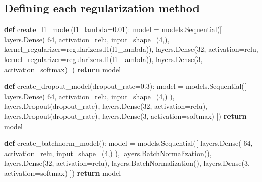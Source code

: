 \documentclass[
]{IEEEtran}
\newenvironment{Shaded}{\begin{snugshade}}{\end{snugshade}}
\newcommand{\ControlFlowTok}[1]{\textcolor[rgb]{0.00,0.23,0.31}{\textbf{#1}}}
\newcommand{\DecValTok}[1]{\textcolor[rgb]{0.68,0.00,0.00}{#1}}
\newcommand{\FloatTok}[1]{\textcolor[rgb]{0.68,0.00,0.00}{#1}}
\newcommand{\KeywordTok}[1]{\textcolor[rgb]{0.00,0.23,0.31}{\textbf{#1}}}
\newcommand{\NormalTok}[1]{\textcolor[rgb]{0.00,0.23,0.31}{#1}}
\newcommand{\OperatorTok}[1]{\textcolor[rgb]{0.37,0.37,0.37}{#1}}
\newcommand{\StringTok}[1]{\textcolor[rgb]{0.13,0.47,0.30}{#1}}
\begin{document}
\subsection{Defining each regularization
method}\label{defining-each-regularization-method}

\begin{Shaded}
\begin{Highlighting}[]
\KeywordTok{def}\NormalTok{ create\_l1\_model(l1\_lambda}\OperatorTok{=}\FloatTok{0.01}\NormalTok{):}
\NormalTok{    model }\OperatorTok{=}\NormalTok{ models.Sequential([}
\NormalTok{        layers.Dense(}
          \DecValTok{64}\NormalTok{, activation}\OperatorTok{=}\StringTok{\textquotesingle{}relu\textquotesingle{}}\NormalTok{,}
\NormalTok{          input\_shape}\OperatorTok{=}\NormalTok{(}\DecValTok{4}\NormalTok{,),}
\NormalTok{          kernel\_regularizer}\OperatorTok{=}\NormalTok{regularizers.l1(l1\_lambda)),}
\NormalTok{        layers.Dense(}\DecValTok{32}\NormalTok{, activation}\OperatorTok{=}\StringTok{\textquotesingle{}relu\textquotesingle{}}\NormalTok{,}
\NormalTok{          kernel\_regularizer}\OperatorTok{=}\NormalTok{regularizers.l1(l1\_lambda)),}
\NormalTok{        layers.Dense(}\DecValTok{3}\NormalTok{, activation}\OperatorTok{=}\StringTok{\textquotesingle{}softmax\textquotesingle{}}\NormalTok{)}
\NormalTok{    ])}
    \ControlFlowTok{return}\NormalTok{ model}

\KeywordTok{def}\NormalTok{ create\_dropout\_model(dropout\_rate}\OperatorTok{=}\FloatTok{0.3}\NormalTok{):}
\NormalTok{    model }\OperatorTok{=}\NormalTok{ models.Sequential([}
\NormalTok{        layers.Dense(}
          \DecValTok{64}\NormalTok{, activation}\OperatorTok{=}\StringTok{\textquotesingle{}relu\textquotesingle{}}\NormalTok{,}
\NormalTok{          input\_shape}\OperatorTok{=}\NormalTok{(}\DecValTok{4}\NormalTok{,)}
\NormalTok{        ),}
\NormalTok{        layers.Dropout(dropout\_rate),}
\NormalTok{        layers.Dense(}\DecValTok{32}\NormalTok{, activation}\OperatorTok{=}\StringTok{\textquotesingle{}relu\textquotesingle{}}\NormalTok{),}
\NormalTok{        layers.Dropout(dropout\_rate),}
\NormalTok{        layers.Dense(}\DecValTok{3}\NormalTok{, activation}\OperatorTok{=}\StringTok{\textquotesingle{}softmax\textquotesingle{}}\NormalTok{)}
\NormalTok{    ])}
    \ControlFlowTok{return}\NormalTok{ model}

\KeywordTok{def}\NormalTok{ create\_batchnorm\_model():}
\NormalTok{    model }\OperatorTok{=}\NormalTok{ models.Sequential([}
\NormalTok{        layers.Dense(}
          \DecValTok{64}\NormalTok{, activation}\OperatorTok{=}\StringTok{\textquotesingle{}relu\textquotesingle{}}\NormalTok{,}
\NormalTok{          input\_shape}\OperatorTok{=}\NormalTok{(}\DecValTok{4}\NormalTok{,)}
\NormalTok{        ),}
\NormalTok{        layers.BatchNormalization(),}
\NormalTok{        layers.Dense(}\DecValTok{32}\NormalTok{, activation}\OperatorTok{=}\StringTok{\textquotesingle{}relu\textquotesingle{}}\NormalTok{),}
\NormalTok{        layers.BatchNormalization(),}
\NormalTok{        layers.Dense(}\DecValTok{3}\NormalTok{, activation}\OperatorTok{=}\StringTok{\textquotesingle{}softmax\textquotesingle{}}\NormalTok{)}
\NormalTok{    ])}
    \ControlFlowTok{return}\NormalTok{ model}


\end{Highlighting}
\end{Shaded}
\end{document}

